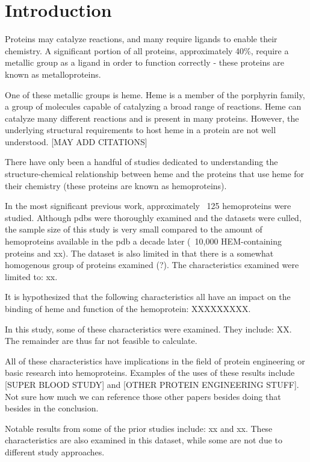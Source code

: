 \chapter{Introduction}
	
	
	Proteins may catalyze reactions, and many require ligands to enable their chemistry. A significant portion of all proteins, approximately 40\%, require a metallic group as a ligand in order to function correctly - these proteins are known as metalloproteins. 
	
	One of these metallic groups is heme. Heme is a member of the porphyrin family, a group of molecules capable of catalyzing a broad range of reactions. Heme can catalyze many different reactions and is present in many proteins. However, the underlying structural requirements to host heme in a protein are not well understood. [MAY ADD CITATIONS]
	
	There have only been a handful of studies dedicated to understanding the structure-chemical relationship between heme and the proteins that use heme for their chemistry (these proteins are known as hemoproteins). 
	
	In the most significant previous work, approximately ~125 hemoproteins were studied\cite{Li2011}. Although pdbs were thoroughly examined and the datasets were culled, the sample size of this study is very small compared to the amount of hemoproteins available in the pdb a decade later (~10,000 HEM-containing proteins and xx). The dataset is also limited in that there is a somewhat homogenous group of proteins examined (?). The characteristics examined were limited to: xx.
	
	It is hypothesized that the following characteristics all have an impact on the binding of heme and function of the hemoprotein: XXXXXXXXX.
	
	In this study, some of these characteristics were examined. They include: XX. The remainder are thus far not feasible to calculate.
	
	All of these characteristics have implications in the field of protein engineering or basic research into hemoproteins. Examples of the uses of these results include [SUPER BLOOD STUDY] and [OTHER PROTEIN ENGINEERING STUFF]. Not sure how much we can reference those other papers besides doing that besides in the conclusion.
	
	Notable results from some of the prior studies include: xx and xx. These characteristics are also examined in this dataset, while some are not due to different study approaches. 

